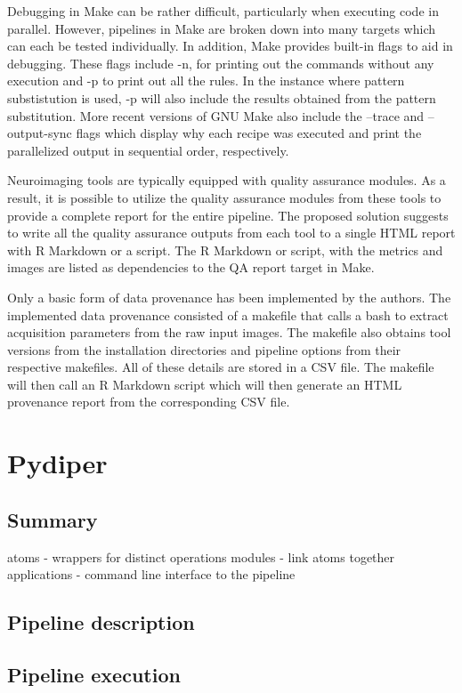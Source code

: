 \documentclass{report}
\begin{document}
    Debugging in Make can be rather difficult, particularly when executing code
in parallel. However, pipelines in Make are broken down into many targets which
can each be tested individually. In addition, Make provides built-in flags to
aid in debugging. These flags include -n, for printing out the commands without
any execution and -p to print out all the rules. In the instance where pattern
substistution is used, -p will also include the results obtained from the
pattern substitution. More recent versions of GNU Make also include the --trace
and --output-sync flags which display why each recipe was executed and print the
parallelized output in sequential order, respectively.


    Neuroimaging tools are typically equipped with quality assurance modules. As
a result, it is possible to utilize the quality assurance modules from these
tools to provide a complete report for the entire pipeline. The proposed
solution suggests to write all the quality assurance outputs from each tool to a single HTML
report with R Markdown or a script. The R Markdown or script, with the metrics
and images are listed as dependencies to the QA report target in Make.


    Only a basic form of data provenance has been implemented by the authors.
The implemented data provenance consisted of a makefile that calls a bash to
extract acquisition parameters from the raw input images. The makefile also
obtains tool versions from the installation directories and pipeline options
from their respective makefiles. All of these details are stored in a CSV file.
The makefile will then call an R Markdown script which will then generate an
HTML provenance report from the corresponding CSV file.

    

          
    \section{Pydiper}
        \subsection{Summary}
        atoms -  wrappers for distinct operations
        modules - link atoms together
        applications - command line interface to the pipeline
        \subsection{Pipeline description}
        \subsection{Pipeline execution}
\end{document}
